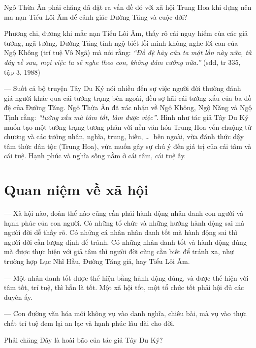 Ngô Thừa Ân phải chăng đã đặt ra vấn đề đó với xã hội Trung Hoa khi dựng nên ma nạn Tiểu Lôi Âm để cảnh giác Đường Tăng và cuộc đời?

Phương chi, đương khi mắc nạn Tiểu Lôi Âm, thấy rõ cái nguy hiểm của các giả tướng, ngã tướng, Đường Tăng tỉnh ngộ biết lỗi mình không nghe lời can của Ngộ Không (trí tuệ Vô Ngã) mà nói rằng: \emph{``Đồ đệ hãy cứu ta một lần này nữa, từ đây về sau, mọi việc ta sẽ nghe theo con, không dám cưỡng nữa.''} (sđd, tr 335, tập 3, 1988)

--- Suốt cả bộ truyện Tây Du Ký nói nhiều đến sự việc người đời thường đánh giá người khác qua cái tướng trạng bên ngoài, đều sợ hãi cái tướng xấu của ba đồ đệ của Đường Tăng. Ngô Thừa Ân đã xác nhận về Ngộ Không, Ngộ Năng và Ngộ Tịnh rằng: \emph{``tướng xấu mà tâm tốt, làm được việc''}. Hình như tác giả Tây Du Ký muốn tạo một tướng trạng tương phản với nền văn hóa Trung Hoa vốn chuộng từ chương và các tướng nhân, nghĩa, trung, hiếu, \ldots ~bên ngoài, vừa đánh thức dậy tâm thức dân tộc (Trung Hoa), vừa muốn gây sự chú ý đến giá trị của cái tâm và cái tuệ. Hạnh phúc và nghĩa sống nằm ở cái tâm, cái tuệ ấy.

\section{Quan niệm về xã hội} %
\label{sec:65_66_xa_hoi}

--- Xã hội nào, đoàn thể nào cũng cần phải hành động nhân danh con người và hạnh phúc của con người. Có những tổ chức và những hướng hành động sai mà người đời dễ thấy rõ. Có những cá nhân nhân danh tốt mà hành động sai thì người đời cần lượng định để tránh. Có những nhân danh tốt và hành động đúng mà được thực hiện với giả tâm thì người đời cũng cần biết để tránh xa, như trường hợp Lục Nhĩ Hầu, Đường Tăng giả, hay Tiểu Lôi Âm.

--- Một nhân danh tốt được thể hiện bằng hành động đúng, và được thể hiện với tâm tốt, trí tuệ, thì hẳn là tốt. Một xã hội tốt, một tổ chức tốt phải hội đủ các duyên ấy.

--- Con đường văn hóa mới không vụ vào danh nghĩa, chiêu bài, mà vụ vào thực chất trí tuệ đem lại an lạc và hạnh phúc lâu dài cho đời.

Phải chăng Đây là hoài bão của tác giả Tây Du Ký?
